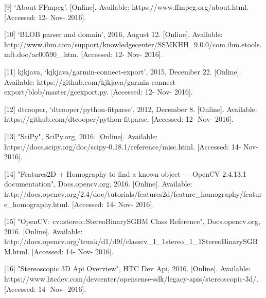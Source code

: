 \documentclass[10pt,draftclsnofoot,onecolumn]{IEEEtran}
\begin{document}
[9] ‘About FFmpeg’. [Online]. Available: https://www.ffmpeg.org/about.html. [Accessed: 12- Nov- 2016].  \\

 \vspace{2mm}

[10] ‘BLOB parser and domain’, 2016, August 12. [Online]. Available: http://www.ibm.com/support/knowledgecenter/SSMKHH_9.0.0/com.ibm.etools.mft.doc/ac00590_.htm. [Accessed: 12- Nov- 2016].  \\
 \vspace{2mm}


[11] kjkjava, ‘kjkjava/garmin-connect-export’, 2015, December 22. [Online]. Available: https://github.com/kjkjava/garmin-connect-export/blob/master/gcexport.py. [Accessed: 12- Nov- 2016].  \\
 \vspace{2mm}


[12] dtcooper, ‘dtcooper/python-fitparse’, 2012, December 8. [Online]. Available: https://github.com/dtcooper/python-fitparse. [Accessed: 12- Nov- 2016]. \\ 

 \vspace{2mm}

[13] "SciPy", SciPy.org, 2016. [Online]. Available: https://docs.scipy.org/doc/scipy-0.18.1/reference/misc.html. [Accessed: 14- Nov- 2016].\\

 \vspace{2mm}

[14] "Features2D + Homography to find a known object — OpenCV 2.4.13.1 documentation", Docs.opencv.org, 2016. [Online]. Available: http://docs.opencv.org/2.4/doc/tutorials/features2d/feature_homography/feature_homography.html. [Accessed: 14- Nov- 2016].\\
 \vspace{2mm}


[15] "OpenCV: cv::stereo::StereoBinarySGBM Class Reference", Docs.opencv.org, 2016. [Online]. Available: http://docs.opencv.org/trunk/d1/d9f/classcv_1_1stereo_1_1StereoBinarySGBM.html. [Accessed: 14- Nov- 2016].\\
 \vspace{2mm}


[16] "Stereoscopic 3D Api Overview", HTC Dev Api, 2016. [Online]. Available: https://www.htcdev.com/devcenter/opensense-sdk/legacy-apis/stereoscopic-3d/. [Accessed: 14- Nov- 2016].\\
 \vspace{2mm}
\end{document}
